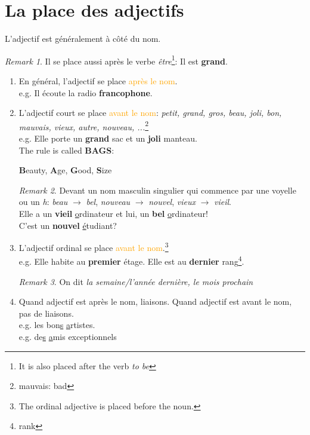 \documentclass[math,code]{amznotes}
\theoremstyle{remark}
\newtheorem*{remark}{Remark}
\begin{document}
\section{La place des adjectifs}
L'adjectif est généralement à côté du nom.
\begin{notebox}
    \begin{remark}
        Il se place aussi après le verbe \textit{être}\footnote{It is also placed after the verb \textit{to be}}: Il est \textbf{grand}.
    \end{remark}
\end{notebox}
\begin{enumerate}
    \item En général, l'adjectif se place \textcolor{orange}{après le nom}. \\
    e.g. Il écoute la radio \textbf{francophone}.
    \item L'adjectif court se place \textcolor{orange}{avant le nom}: \textit{petit, grand, gros, beau, joli, bon, mauvais, vieux, autre, nouveau, ...}\footnote{mauvais: bad} \\
    e.g. Elle porte un \textbf{grand} sac et un \textbf{joli} manteau. \\
    The rule is called \textbf{BAGS}:
    \begin{center}
        \textbf{B}eauty, \textbf{A}ge, \textbf{G}ood, \textbf{S}ize 
    \end{center}
    \begin{notebox}
        \begin{remark}
            Devant un nom masculin singulier qui commence par une voyelle ou un \textit{h}: \textit{beau} $\rightarrow$ \textit{bel}, \textit{nouveau} $\rightarrow$ \textit{nouvel}, \textit{vieux}  $\rightarrow$ \textit{vieil}. \\
            Elle a un \textbf{vieil} \underline{o}rdinateur et lui, un \textbf{bel} \underline{o}rdinateur! \\
            C'est un \textbf{nouvel} \underline{é}tudiant?
        \end{remark}
    \end{notebox}
    \item L'adjectif ordinal se place \textcolor{orange}{avant le nom}.\footnote{The ordinal adjective is placed before the noun.} \\
    e.g. Elle habite au \textbf{premier} étage. Elle est au \textbf{dernier} rang\footnote{rank}.\
    \begin{notebox}
        \begin{remark}
            On dit \textit{la semaine/l'année dernière, le mois prochain}
        \end{remark}
    \end{notebox}
    \item Quand adjectif est après le nom, liaisons. Quand adjectif est avant le nom, pas de liaisons. \\
    e.g. les bon\underline{s} \underline{a}rtistes. \\
    e.g. de\underline{s} \underline{a}mis exceptionnels
\end{enumerate}
\end{document}
